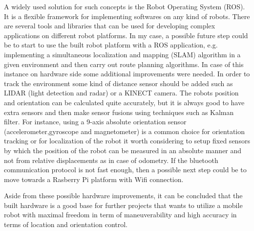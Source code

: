 \documentclass[12pt,english,twoside]{article}
\begin{document}
A widely used solution for such concepts is the Robot Operating System (ROS). It is a flexible framework for implementing softwares on any kind of robots. There are several tools and libraries that can be used for developing complex applications on different robot platforms. In my case, a possible future step could be to start to use the built robot platform with a ROS application, e.g. implementing a simultaneous localization and mapping (SLAM) algorithm in a given environment and then carry out route planning algorithms. In case of this instance on hardware side some additional improvements were needed. In order to track the environment some kind of distance sensor should be added such as LIDAR (light detection and radar) or a KINECT camera. The robots position and orientation can be calculated quite accurately, but it is always good to have extra sensors and then make sensor fusions using techniques such as Kalman filter. For instance, using a 9-axis absolute orientation sensor (accelerometer,gyroscope and magnetometer) is a common choice for orientation tracking or for localization of the robot it worth considering to setup fixed sensors by which the position of the robot can be measured in an absolute manner and not from relative displacements as in case of odometry. If the bluetooth communication protocol is not fast enough, then a possible next step could be to move towards a Rasberry Pi platform with Wifi connection. 

Aside from these possible hardware improvements, it can be concluded that the built hardware is a good base for further projects that wants to utilize a mobile robot with maximal freedom in term of maneuverability and high accuracy in terms of location and orientation control.

\end{document}
